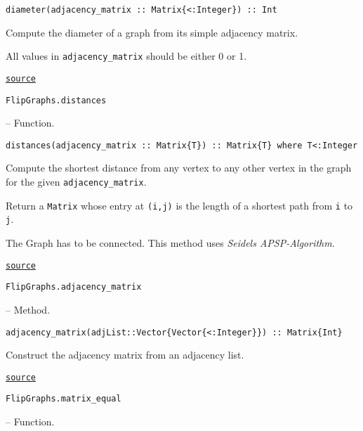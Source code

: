 \begin{adjustwidth}{2em}{0pt}


\begin{verbatim}
diameter(adjacency_matrix :: Matrix{<:Integer}) :: Int
\end{verbatim}

Compute the diameter of a graph from its simple adjacency matrix.

All values in \texttt{adjacency\_matrix} should be either 0 or 1.



\href{https://github.com/schto223/FlipGraphs.jl/blob/490c01a7adf74b42f27dda05099165c47ae8133e/src/generalUtilities.jl#L1-L7}{\texttt{source}}


\end{adjustwidth}
\hypertarget{15595577474420342013}{\texttt{FlipGraphs.distances}}  -- {Function.}

\begin{adjustwidth}{2em}{0pt}


\begin{verbatim}
distances(adjacency_matrix :: Matrix{T}) :: Matrix{T} where T<:Integer
\end{verbatim}

Compute the shortest distance from any vertex to any other vertex in the graph for the given \texttt{adjacency\_matrix}.

Return a \texttt{Matrix} whose entry at \texttt{(i,j)} is the length of a shortest path from \texttt{i} to \texttt{j}.

The Graph has to be connected. This method uses \emph{Seidels APSP-Algorithm}.



\href{https://github.com/schto223/FlipGraphs.jl/blob/490c01a7adf74b42f27dda05099165c47ae8133e/src/generalUtilities.jl#L89-L97}{\texttt{source}}


\end{adjustwidth}
\hypertarget{16883507873940775758}{\texttt{FlipGraphs.adjacency\_matrix}}  -- {Method.}

\begin{adjustwidth}{2em}{0pt}


\begin{verbatim}
adjacency_matrix(adjList::Vector{Vector{<:Integer}}) :: Matrix{Int}
\end{verbatim}

Construct the adjacency matrix from an adjacency list.



\href{https://github.com/schto223/FlipGraphs.jl/blob/490c01a7adf74b42f27dda05099165c47ae8133e/src/generalUtilities.jl#L153-L157}{\texttt{source}}


\end{adjustwidth}
\hypertarget{2902498613952484789}{\texttt{FlipGraphs.matrix\_equal}}  -- {Function.}

